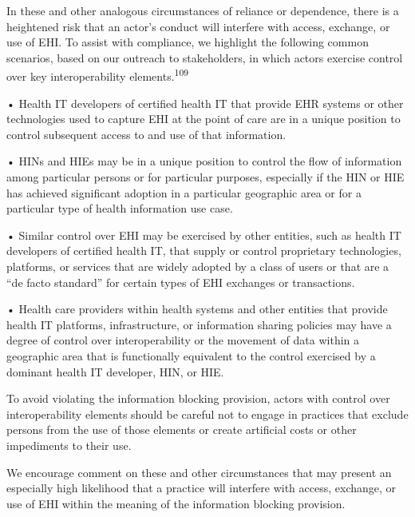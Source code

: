 \documentclass[twoside,11pt]{article}
\begin{document}
          In these and other analogous circumstances of reliance or dependence, there is a heightened risk that an actor's conduct will interfere with access, exchange, or use of EHI. To assist with compliance, we highlight the following common scenarios, based on our outreach to stakeholders, in which  \ifhmode\expandafter\xspace\fi actors exercise control over key interoperability elements.\textsuperscript{109}
            
          




          • Health IT developers of certified health IT that provide EHR systems or other technologies used to capture EHI at the point of care are in a unique position to control subsequent access to and use of that information.


          • HINs and HIEs may be in a unique position to control the flow of information among particular persons or for particular purposes, especially if the HIN or HIE has achieved significant adoption in a particular geographic area or for a particular type of health information use case.


          • Similar control over EHI may be exercised by other entities, such as health IT developers of certified health IT, that supply or control proprietary technologies, platforms, or services that are widely adopted by a class of users or that are a “de facto standard” for certain types of EHI exchanges or transactions.


          • Health care providers within health systems and other entities that provide health IT platforms, infrastructure, or information sharing policies may have a degree of control over interoperability or the movement of data within a geographic area that is functionally equivalent to the control exercised by a dominant health IT developer, HIN, or HIE.


          To avoid violating the information blocking provision, actors with control over interoperability elements should be careful not to engage in practices that exclude persons from the use of those elements or create artificial costs or other impediments to their use.


          We encourage comment on these and other circumstances that may present an especially high likelihood that a practice will interfere with access, exchange, or use of EHI within the meaning of the information blocking provision.
\end{document}
